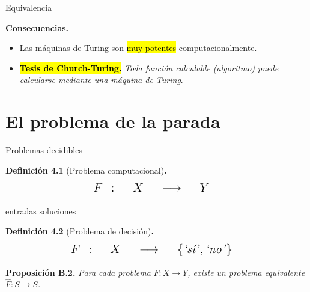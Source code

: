 \documentclass[10pt,xcolor=dvipsnames,aspectratio=169,spanish]{beamer}
\makeatletter
\let\HL\hl
\renewcommand\hl{%
  \let\set@color\beamerorig@set@color
  \let\reset@color\beamerorig@reset@color
  \HL}
\makeatother
\begin{document}
\begin{frame}{Equivalencia}

\textbf{Consecuencias.}

\begin{itemize}
    \item Las máquinas de Turing son \hl{muy potentes} computacionalmente.

    \pause
    \item \hl{\textbf{Tesis de Church-Turing.}} \emph{Toda función calculable (algoritmo) puede calcularse mediante una máquina de Turing}.
    
\end{itemize}

\end{frame}


\section{El problema de la parada}

\begin{frame}{Problemas decidibles}

\textbf{Definición 4.1} (Problema computacional)\textbf{.}
$${ \Large
\begin{matrix}
    F & : & \;\;\; X  \;\;\; & \longrightarrow & \;\;\; Y \;\;\; \\
\end{matrix}
}$$
\begin{center}
\vspace*{-2mm}
    \hspace{11mm} entradas \hspace{9mm} soluciones
\end{center}
\vspace{5mm}
\textbf{Definición 4.2} (Problema de decisión)\textbf{.}
$${ \Large
\begin{matrix}
    F & : & \;\;\; X  \;\;\; & \longrightarrow & \;\;\; \{\text{\emph{`sí'}}, \text{\emph{`no'}}\} \;\;\; \\
\end{matrix}
}$$
\vspace{2mm}

\pause

\textbf{Proposición B.2.} \emph{Para cada problema} $F:X\longrightarrow Y$\emph{, existe un problema equivalente} $\widehat{F}:S\longrightarrow S$.

\end{frame}
\end{document}
